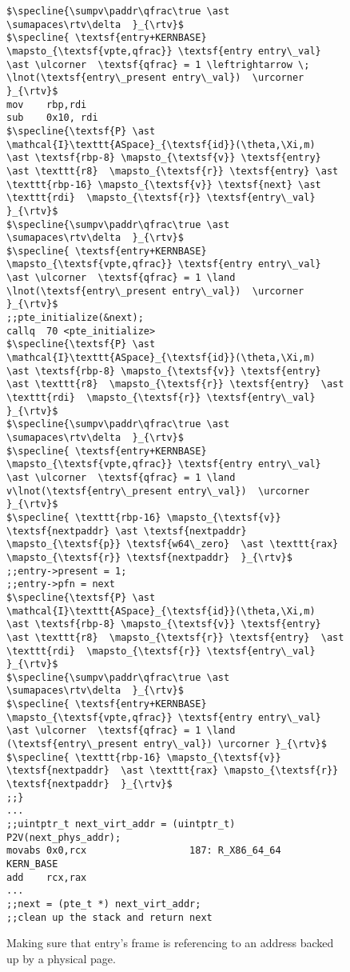 \begin{figure}
\begin{lstlisting}[mathescape]
$\specline{\sumpv\paddr\qfrac\true \ast \sumapaces\rtv\delta  }_{\rtv}$
$\specline{ \textsf{entry+KERNBASE} \mapsto_{\textsf{vpte,qfrac}} \textsf{entry entry\_val} \ast \ulcorner  \textsf{qfrac} = 1 \leftrightarrow \; \lnot(\textsf{entry\_present entry\_val})  \urcorner }_{\rtv}$
mov    rbp,rdi
sub    0x10, rdi
$\specline{\textsf{P} \ast \mathcal{I}\texttt{ASpace}_{\textsf{id}}(\theta,\Xi,m)  \ast \textsf{rbp-8} \mapsto_{\textsf{v}} \textsf{entry} \ast \texttt{r8}  \mapsto_{\textsf{r}} \textsf{entry} \ast \texttt{rbp-16} \mapsto_{\textsf{v}} \textsf{next} \ast \texttt{rdi}  \mapsto_{\textsf{r}} \textsf{entry\_val}  }_{\rtv}$
$\specline{\sumpv\paddr\qfrac\true \ast \sumapaces\rtv\delta  }_{\rtv}$
$\specline{ \textsf{entry+KERNBASE} \mapsto_{\textsf{vpte,qfrac}} \textsf{entry entry\_val} \ast \ulcorner  \textsf{qfrac} = 1 \land \lnot(\textsf{entry\_present entry\_val})  \urcorner }_{\rtv}$
;;pte_initialize(&next);
callq  70 <pte_initialize>
$\specline{\textsf{P} \ast \mathcal{I}\texttt{ASpace}_{\textsf{id}}(\theta,\Xi,m)  \ast \textsf{rbp-8} \mapsto_{\textsf{v}} \textsf{entry} \ast \texttt{r8}  \mapsto_{\textsf{r}} \textsf{entry}  \ast \texttt{rdi}  \mapsto_{\textsf{r}} \textsf{entry\_val}  }_{\rtv}$
$\specline{\sumpv\paddr\qfrac\true \ast \sumapaces\rtv\delta  }_{\rtv}$
$\specline{ \textsf{entry+KERNBASE} \mapsto_{\textsf{vpte,qfrac}} \textsf{entry entry\_val} \ast \ulcorner  \textsf{qfrac} = 1 \land v\lnot(\textsf{entry\_present entry\_val})  \urcorner }_{\rtv}$
$\specline{ \texttt{rbp-16} \mapsto_{\textsf{v}} \textsf{nextpaddr} \ast \textsf{nextpaddr} \mapsto_{\textsf{p}} \textsf{w64\_zero}  \ast \texttt{rax} \mapsto_{\textsf{r}} \textsf{nextpaddr}  }_{\rtv}$
;;entry->present = 1;
;;entry->pfn = next
$\specline{\textsf{P} \ast \mathcal{I}\texttt{ASpace}_{\textsf{id}}(\theta,\Xi,m)  \ast \textsf{rbp-8} \mapsto_{\textsf{v}} \textsf{entry} \ast \texttt{r8}  \mapsto_{\textsf{r}} \textsf{entry}  \ast \texttt{rdi}  \mapsto_{\textsf{r}} \textsf{entry\_val}  }_{\rtv}$
$\specline{\sumpv\paddr\qfrac\true \ast \sumapaces\rtv\delta  }_{\rtv}$
$\specline{ \textsf{entry+KERNBASE} \mapsto_{\textsf{vpte,qfrac}} \textsf{entry entry\_val} \ast \ulcorner  \textsf{qfrac} = 1 \land (\textsf{entry\_present entry\_val}) \urcorner }_{\rtv}$
$\specline{ \texttt{rbp-16} \mapsto_{\textsf{v}} \textsf{nextpaddr}  \ast \texttt{rax} \mapsto_{\textsf{r}} \textsf{nextpaddr}  }_{\rtv}$
;;}
...
;;uintptr_t next_virt_addr = (uintptr_t) P2V(next_phys_addr);
movabs 0x0,rcx	                187: R_X86_64_64	KERN_BASE
add    rcx,rax
...
;;next = (pte_t *) next_virt_addr;
;;clean up the stack and return next
\end{lstlisting}
\vspace{-1em}
\caption{Making sure that \textsf{entry}'s frame is referencing to an address backed up by a physical page.}
\label{fig:calltopteinitialize}
\end{figure}

